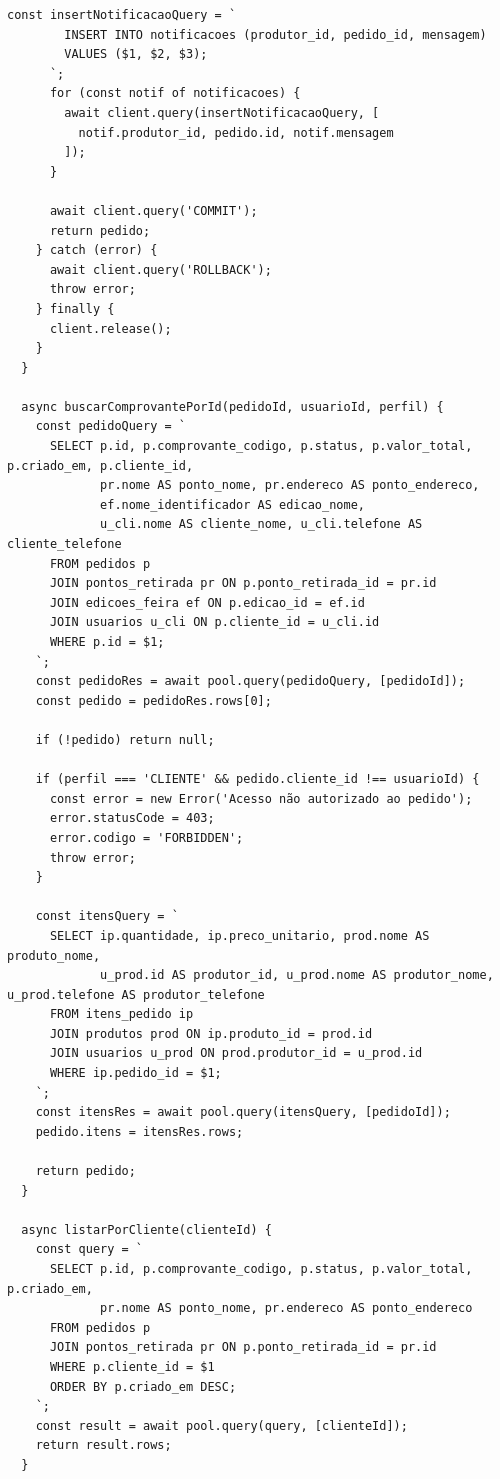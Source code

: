 \begin{lstlisting}[caption={src/modules/order/order.repository.js}]
      const insertNotificacaoQuery = `
        INSERT INTO notificacoes (produtor_id, pedido_id, mensagem)
        VALUES ($1, $2, $3);
      `;
      for (const notif of notificacoes) {
        await client.query(insertNotificacaoQuery, [
          notif.produtor_id, pedido.id, notif.mensagem
        ]);
      }

      await client.query('COMMIT');
      return pedido;
    } catch (error) {
      await client.query('ROLLBACK');
      throw error;
    } finally {
      client.release();
    }
  }

  async buscarComprovantePorId(pedidoId, usuarioId, perfil) {
    const pedidoQuery = `
      SELECT p.id, p.comprovante_codigo, p.status, p.valor_total, p.criado_em, p.cliente_id,
             pr.nome AS ponto_nome, pr.endereco AS ponto_endereco,
             ef.nome_identificador AS edicao_nome,
             u_cli.nome AS cliente_nome, u_cli.telefone AS cliente_telefone
      FROM pedidos p
      JOIN pontos_retirada pr ON p.ponto_retirada_id = pr.id
      JOIN edicoes_feira ef ON p.edicao_id = ef.id
      JOIN usuarios u_cli ON p.cliente_id = u_cli.id
      WHERE p.id = $1;
    `;
    const pedidoRes = await pool.query(pedidoQuery, [pedidoId]);
    const pedido = pedidoRes.rows[0];

    if (!pedido) return null;

    if (perfil === 'CLIENTE' && pedido.cliente_id !== usuarioId) {
      const error = new Error('Acesso não autorizado ao pedido');
      error.statusCode = 403;
      error.codigo = 'FORBIDDEN';
      throw error;
    }

    const itensQuery = `
      SELECT ip.quantidade, ip.preco_unitario, prod.nome AS produto_nome,
             u_prod.id AS produtor_id, u_prod.nome AS produtor_nome, u_prod.telefone AS produtor_telefone
      FROM itens_pedido ip
      JOIN produtos prod ON ip.produto_id = prod.id
      JOIN usuarios u_prod ON prod.produtor_id = u_prod.id
      WHERE ip.pedido_id = $1;
    `;
    const itensRes = await pool.query(itensQuery, [pedidoId]);
    pedido.itens = itensRes.rows;

    return pedido;
  }

  async listarPorCliente(clienteId) {
    const query = `
      SELECT p.id, p.comprovante_codigo, p.status, p.valor_total, p.criado_em,
             pr.nome AS ponto_nome, pr.endereco AS ponto_endereco
      FROM pedidos p
      JOIN pontos_retirada pr ON p.ponto_retirada_id = pr.id
      WHERE p.cliente_id = $1
      ORDER BY p.criado_em DESC;
    `;
    const result = await pool.query(query, [clienteId]);
    return result.rows;
  }


\end{lstlisting}
